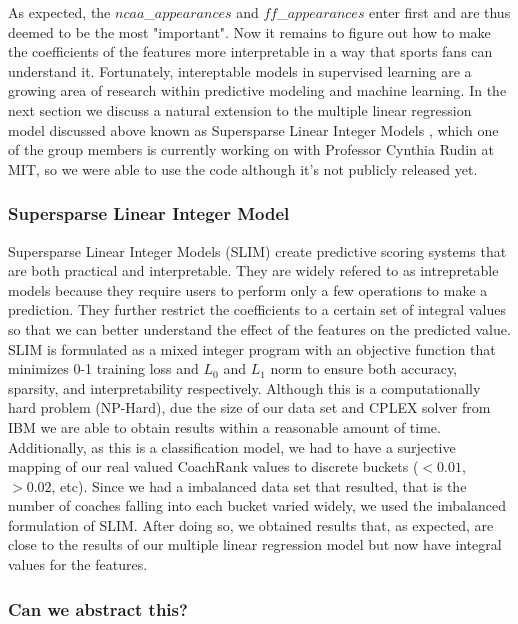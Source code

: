 \documentclass[11pt,notitlepage]{article}
\begin{document}
\noindent As expected, the $ncaa$\_$appearances$ and $ff$\_$appearances$ enter first and are thus deemed to be the most "important". Now it remains to figure out how to make the coefficients of the features more interpretable in a way that sports fans can understand it. Fortunately, intereptable models in supervised learning are a growing area of research within predictive modeling and machine learning. In the next section we discuss a natural extension to the multiple linear regression model discussed above known as Supersparse Linear Integer Models \cite{SLIM}, which one of the group members is currently working on with Professor Cynthia Rudin at MIT, so we were able to use the code although it's not publicly released yet.

\subsubsection*{Supersparse Linear Integer Model}

Supersparse Linear Integer Models (SLIM) create predictive scoring systems that are both practical and interpretable. They are widely refered to as intrepretable models because they require users to perform only a few operations to make a prediction. They further restrict the coefficients to a certain set of integral values so that we can better understand the effect of the features on the predicted value. SLIM is formulated as a mixed integer program with an objective function that minimizes 0-1 training loss and $L_0$ and $L_1$ norm to ensure both accuracy, sparsity, and interpretability respectively. Although this is a computationally hard problem (NP-Hard), due the size of our data set and CPLEX solver from IBM we are able to obtain results within a reasonable amount of time. Additionally, as this is a classification model, we had to have a surjective mapping of our real valued CoachRank values to discrete buckets ($<0.01$, $>0.02$, etc). Since we had a imbalanced data set that resulted, that is the number of coaches falling into each bucket varied widely, we used the imbalanced formulation of SLIM. After doing so, we obtained results that, as expected, are close to the results of our multiple linear regression model but now have integral values for the features.        

\subsubsection*{Can we abstract this?}
\end{document}
